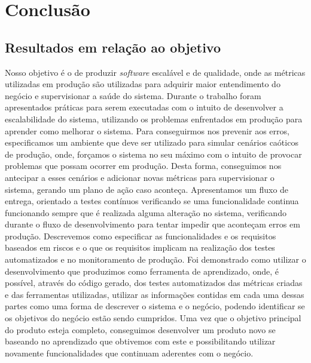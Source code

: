 \part{Conclusão}
  \chapter{Resultados em relação ao objetivo}
    Nosso objetivo é o de produzir \textit{software} escalável e de qualidade,
    onde as métricas utilizadas em produção são utilizadas para adquirir maior
    entendimento do negócio e supervisionar a saúde do sistema. \newline
    Durante o trabalho foram apresentados práticas para serem executadas com o
    intuito de desenvolver a escalabilidade do sistema, utilizando os problemas
    enfrentados em produção para aprender como melhorar o sistema. Para conseguirmos
    nos prevenir aos erros, especificamos um ambiente que deve ser utilizado para
    simular cenários caóticos de produção, onde, forçamos o sistema no seu máximo
    com o intuito de provocar problemas que possam ocorrer em produção. Desta
    forma, conseguimos nos antecipar a esses cenários e adicionar novas métricas
    para supervisionar o sistema, gerando um plano de ação caso
    aconteça. \newline
    Apresentamos um fluxo de entrega, orientado a testes contínuos verificando
    se uma funcionalidade continua funcionando sempre que é realizada alguma
    alteração no sistema, verificando durante o fluxo de desenvolvimento para
    tentar impedir que aconteçam erros em produção. Descrevemos como especificar
    as funcionalidades e os requisitos baseados em riscos e o que os requisitos implicam
    na realização dos testes automatizados e no monitoramento de produção. \newline
    Foi demonstrado como utilizar o desenvolvimento que produzimos como ferramenta de
    aprendizado, onde, é possível, através do código gerado, dos testes automatizados
    das métricas criadas e das ferramentas utilizadas, utilizar as informações
    contidas em cada uma dessas partes como uma forma de descrever o sistema e o
    negócio, podendo identificar se os objetivos do negócio estão sendo cumpridos.
    Uma vez que o objetivo principal do produto esteja completo, conseguimos
    desenvolver um produto novo se baseando no aprendizado que obtivemos com este
    e possibilitando utilizar novamente funcionalidades que continuam aderentes
    com o negócio.


